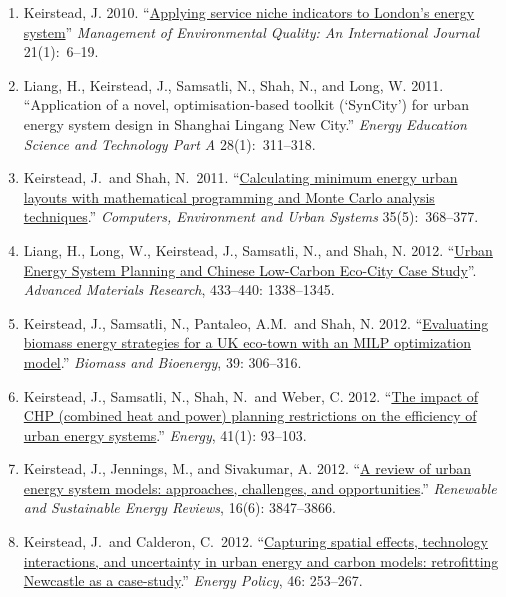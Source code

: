\documentclass[11pt,a4paper]{article}
\newcommand{\flag}{\marginpar{\hfill\raisebox{-2pt}{*}}}
\begin{document}
\begin{enumerate}
\item Keirstead, J. 2010. ``\href{http://dx.doi.org/10.1108/14777831011010829}{Applying service niche indicators to London's energy system}'' \emph{Management of Environmental Quality: An International Journal} 21(1):~6--19.

\item Liang, H., Keirstead, J., Samsatli, N., Shah, N., and Long, W. 2011. ``Application of a novel, optimisation-based toolkit (`SynCity') for urban energy system design in Shanghai Lingang New City.'' \emph{Energy Education Science and Technology Part A} 28(1):~311--318.

\item Keirstead, J.\  and Shah, N.\flag\ 2011. ``\href{http://dx.doi.org/10.1016/j.compenvurbsys.2010.12.005}{Calculating minimum energy urban layouts with mathematical programming and Monte Carlo analysis techniques}.'' \emph{Computers, Environment and Urban Systems} 35(5):~368--377. 

\item Liang, H., Long, W., Keirstead, J., Samsatli, N., and Shah, N. 2012. ``\href{http://dx.doi.org/10.4028/www.scientific.net/AMR.433-440.1338}{Urban Energy System Planning and Chinese Low-Carbon Eco-City Case Study}''. \emph{Advanced Materials Research}, 433--440: 1338--1345. 

\item Keirstead, J., Samsatli, N., Pantaleo, A.M.\, and Shah, N. 2012. ``\href{http://dx.doi.org/10.1016/j.biombioe.2012.01.022}{Evaluating biomass energy strategies for a UK eco-town with an MILP optimization model}.'' \emph{Biomass and Bioenergy}, 39: 306--316.

\item Keirstead, J., Samsatli, N., Shah, N.\  and Weber, C. 2012. ``\href{http://dx.doi.org/10.1016/j.energy.2011.06.011}{The impact of CHP (combined heat and power) planning restrictions on the efficiency of urban energy systems}.'' \emph{Energy}, 41(1): 93--103.

\item Keirstead, J., Jennings, M., and Sivakumar, A. 2012. ``\href{http://dx.doi.org/10.1016/j.rser.2012.02.047}{A review of urban energy system models: approaches, challenges, and opportunities}.'' \emph{Renewable and Sustainable Energy Reviews}, 16(6): 3847--3866.

\item Keirstead, J.\  and Calderon, C.\flag\  2012. ``\href{http://dx.doi.org/10.1016/j.enpol.2012.03.058}{Capturing spatial effects, technology interactions, and uncertainty in urban energy and carbon models: retrofitting Newcastle as a case-study}.''  \emph{Energy Policy}, 46: 253--267.


\end{enumerate}
\end{document}
